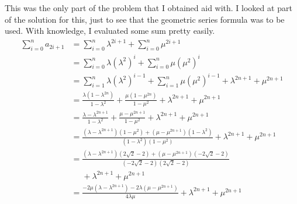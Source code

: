\documentclass[12pt]{article}
\begin{document}
This was the only part of the problem that I obtained aid with.
I looked at part of the solution for this, just to see that the geometric series formula was to be used.
With knowledge, I evaluated some sum pretty easily.
\begin{align*}
    \sum_{i=0}^{n} a_{2i+1} & = \sum_{i=0}^{n} \lambda^{2i+1} + \sum_{i=0}^{n} \mu^{2i+1}                                                                                                                                        \\
                            & = \sum_{i=0}^{n} \lambda\left(\lambda^2\right)^i + \sum_{i=0}^{n} \mu\left(\mu^2\right)^i                                                                                                          \\
                            & = \sum_{i=1}^{n} \lambda\left(\lambda^2\right)^{i-1} + \sum_{i=1}^{n} \mu\left(\mu^2\right)^{i-1} + \lambda^{2n+1} + \mu^{2n+1}                                                                    \\
                            & = \frac{\lambda\left(1-\lambda^{2n}\right)}{1-\lambda^2} + \frac{\mu\left(1-\mu^{2n}\right)}{1-\mu^2} + \lambda^{2n+1} + \mu^{2n+1}                                                                \\
                            & = \frac{\lambda-\lambda^{2n+1}}{1-\lambda^2} + \frac{\mu-\mu^{2n+1}}{1-\mu^2} + \lambda^{2n+1} + \mu^{2n+1}                                                                                        \\
                            & = \frac{\left(\lambda-\lambda^{2n+1}\right)\left(1-\mu^2\right) + \left(\mu-\mu^{2n+1}\right)\left(1-\lambda^2\right)}{\left(1-\lambda^2\right)\left(1-\mu^2\right)} + \lambda^{2n+1} + \mu^{2n+1} \\
                            & = \frac{\left(\lambda-\lambda^{2n+1}\right)\left(2\sqrt{2}-2\right) + \left(\mu-\mu^{2n+1}\right)\left(-2\sqrt{2}-2\right)}{\left(-2\sqrt{2}-2\right)\left(2\sqrt{2}-2\right)}                     \\
                            & \phantom{=}+ \lambda^{2n+1} + \mu^{2n+1}                                                                                                                                                           \\
                            & = \frac{-2\mu\left(\lambda-\lambda^{2n+1}\right) - 2\lambda\left(\mu-\mu^{2n+1}\right)}{4\lambda\mu} + \lambda^{2n+1} + \mu^{2n+1}                                                                 \\

\end{align*}
\end{document}
